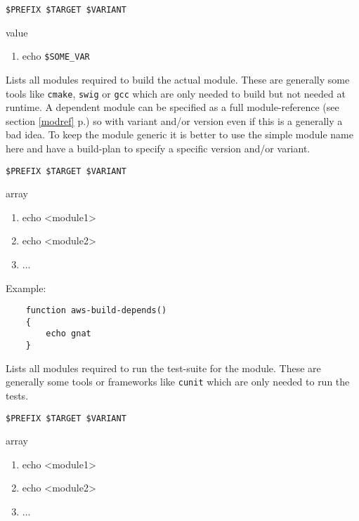 \documentclass[a4paper,12pt,twoside]{article}
\newcommand{\code}[1]{\texttt{#1}}
\newcommand{\seeref}[1]{see section \ref{#1} p.\pageref{#1}}
\begin{document}
\begin{description}[font=\large\texttt]
	\begin{description}[font=\textit,style=standard]
		\item[parameter] \tabto{2cm} \code{\$PREFIX \$TARGET \$VARIANT}
		\item[return] \tabto{2cm} value
		\begin{enumerate}
			\item echo \code{\$SOME\_VAR}
		\end{enumerate}
	\end{description}

	\item[<module>{[}-common|<variant>{]}-build-depends] Lists all modules required to build the actual module. These are generally some tools like \code{cmake}, \code{swig} or \code{gcc} which are only needed to build but not needed at runtime. A dependent module can be specified as a full module-reference (\seeref{modref}) so with variant and/or version even if this is a generally a bad idea. To keep the module generic it is better to use the simple module name here and have a build-plan to specify a specific version and/or variant.

	\begin{description}[font=\textit,style=standard]
		\item[parameter] \tabto{2cm} \code{\$PREFIX \$TARGET \$VARIANT}
		\item[return] \tabto{2cm} array
		\begin{enumerate}
			\item echo <module1>
			\item echo <module2>
			\item ...
		\end{enumerate}
	\end{description}

	Example:
	\begin{lstlisting}
	function aws-build-depends()
	{
		echo gnat
	}
	\end{lstlisting}

	\item[<module>{[}-common|<variant>{]}-tests-depends] Lists all modules required to run the test-suite for the module. These are generally some tools or frameworks like \code{cunit} which are only needed to run the tests.

	\begin{description}[font=\textit,style=standard]
		\item[parameter] \tabto{2cm} \code{\$PREFIX \$TARGET \$VARIANT}
		\item[return] \tabto{2cm} array
		\begin{enumerate}
			\item echo <module1>
			\item echo <module2>
			\item ...
		\end{enumerate}
	\end{description}


\end{description}
\end{document}
